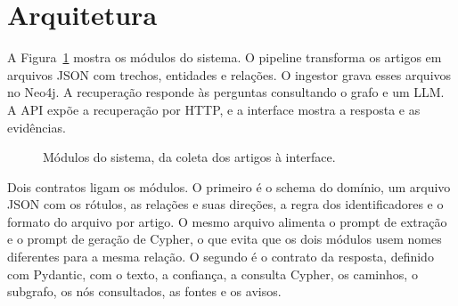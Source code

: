 \documentclass[12pt]{article}
\begin{document}
\section{Arquitetura}
\label{sec:arquitetura}

A Figura~\ref{fig:arquitetura} mostra os módulos do sistema. O pipeline transforma os
artigos em arquivos JSON com trechos, entidades e relações. O ingestor grava esses
arquivos no Neo4j. A recuperação responde às perguntas consultando o grafo e um LLM. A
API expõe a recuperação por HTTP, e a interface mostra a resposta e as evidências.

\begin{figure}[ht]
\centering
{}
\caption{Módulos do sistema, da coleta dos artigos à interface.}
\label{fig:arquitetura}
\end{figure}

Dois contratos ligam os módulos. O primeiro é o schema do domínio, um arquivo JSON com os
rótulos, as relações e suas direções, a regra dos identificadores e o formato do arquivo
por artigo. O mesmo arquivo alimenta o prompt de extração e o prompt de geração de
Cypher, o que evita que os dois módulos usem nomes diferentes para a mesma relação. O
segundo é o contrato da resposta, definido com Pydantic, com o texto, a confiança, a
consulta Cypher, os caminhos, o subgrafo, os nós consultados, as fontes e os avisos.
\end{document}

